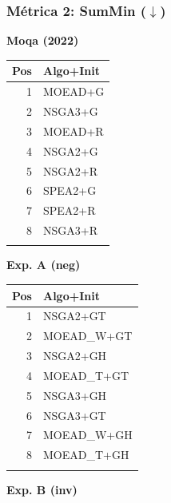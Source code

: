 \documentclass[a4paper,10pt]{article}
\begin{document}
\subsubsection{Métrica 2: SumMin \texorpdfstring{($\downarrow$)}{(down)}}
\begin{table}[H]
    \centering
    \begin{minipage}[t]{0.32\textwidth}
        \centering\scriptsize\textbf{Moqa (2022)}\\
        \begin{tabular}{rl}
            \toprule
            Pos & Algo+Init \\ \midrule
            1 & MOEAD+G \\
            2 & NSGA3+G \\
            3 & MOEAD+R \\
            4 & NSGA2+G \\
            5 & NSGA2+R \\
            6 & SPEA2+G \\
            7 & SPEA2+R \\
            8 & NSGA3+R \\
            \\
            \bottomrule
        \end{tabular}
    \end{minipage}
    \hfill
    \begin{minipage}[t]{0.32\textwidth}
        \centering\scriptsize\textbf{Exp. A (neg)}\\
        \begin{tabular}{rl}
            \toprule
            Pos & Algo+Init \\ \midrule
            1 & NSGA2+GT \\
            2 & MOEAD\_W+GT \\
            3 & NSGA2+GH \\
            4 & MOEAD\_T+GT \\
            5 & NSGA3+GH \\
            6 & NSGA3+GT \\
            7 & MOEAD\_W+GH \\
            8 & MOEAD\_T+GH \\
            \\
            \bottomrule
        \end{tabular}
    \end{minipage}
    \hfill
    \begin{minipage}[t]{0.32\textwidth}
        \centering\scriptsize\textbf{Exp. B (inv)}\\

\end{minipage}
\end{table}
\end{document}
